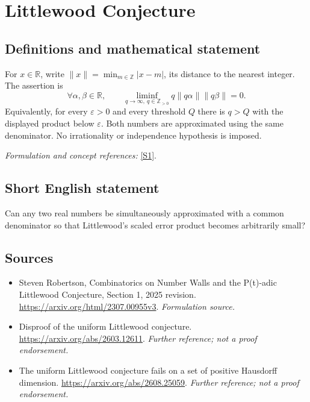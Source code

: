 \documentclass[11pt]{article}
\begin{document}
\section*{\texorpdfstring{Littlewood Conjecture}{Littlewood Conjecture}}\label{95}
\subsection{Definitions and mathematical statement}
For $x\in{\mathbb{R}}$, write $\|x\|=\min_{m\in{\mathbb{Z}}}|x-m|$, its distance to the nearest integer. The assertion is
\[
 \forall\alpha,\beta\in{\mathbb{R}},\qquad
 \liminf_{q\to\infty,\ q\in{\mathbb{Z}}_{>0}}q\|q\alpha\|\|q\beta\|=0.
\]
Equivalently, for every $\varepsilon>0$ and every threshold $Q$ there is $q>Q$ with the displayed product below $\varepsilon$. Both numbers are approximated using the same denominator. No irrationality or independence hypothesis is imposed.
\par\smallskip\textit{Formulation and concept references:} \href{https://arxiv.org/html/2307.00955v3}{[S1]}.

\subsection{Short English statement}
Can any two real numbers be simultaneously approximated with a common denominator so that Littlewood's scaled error product becomes arbitrarily small?
\subsection{Sources}
\begin{itemize}
\item[S1]Steven Robertson, Combinatorics on Number Walls and the P(t)-adic Littlewood Conjecture, Section 1, 2025 revision.
\url{https://arxiv.org/html/2307.00955v3}.
\textit{Formulation source.}
\item[S2]Disproof of the uniform Littlewood conjecture.
\url{https://arxiv.org/abs/2603.12611}.
\textit{Further reference; not a proof endorsement.}
\item[S3]The uniform Littlewood conjecture fails on a set of positive Hausdorff dimension.
\url{https://arxiv.org/abs/2608.25059}.
\textit{Further reference; not a proof endorsement.}
\end{itemize}
\end{document}
